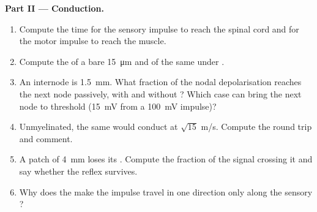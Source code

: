 \begin{problem}
\medskip
\noindent\textbf{Part II --- Conduction.}
\begin{enumerate}[resume]
  \item Compute the time for the sensory impulse to reach the spinal
        cord and for the motor impulse to reach the muscle.
  \item Compute the  of a bare \qty{15}{\micro m}
         and of the same  under .
  \item An internode is \qty{1.5}{mm}. What fraction of the nodal
        depolarisation reaches the next node passively, with and
        without ? Which case can bring the next node to
        threshold (\qty{15}{mV} from a \qty{100}{mV} impulse)?
  \item Unmyelinated, the same  would conduct at $\sqrt{15}$
        m/s. Compute the round trip and comment.
  \item A patch of \qty{4}{mm} loses its . Compute the
        fraction of the signal crossing it and say whether the reflex
        survives.
  \item Why does the  make the impulse travel in
        one direction only along the sensory ?
\end{enumerate}


\end{problem}
